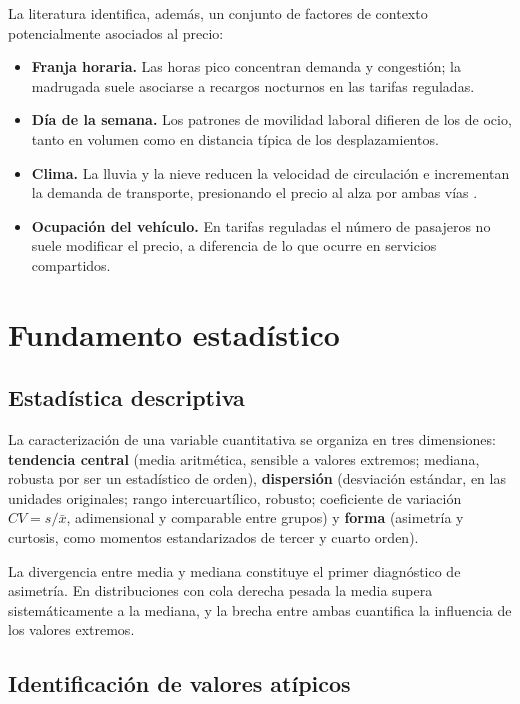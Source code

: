 \documentclass[
]{book}
\providecommand{\tightlist}{%
  \setlength{\itemsep}{0pt}\setlength{\parskip}{0pt}}
\begin{document}
La literatura identifica, además, un conjunto de factores de contexto potencialmente
asociados al precio:

\begin{itemize}
\tightlist
\item
  \textbf{Franja horaria.} Las horas pico concentran demanda y congestión; la madrugada suele
  asociarse a recargos nocturnos en las tarifas reguladas.
\item
  \textbf{Día de la semana.} Los patrones de movilidad laboral difieren de los de ocio, tanto en
  volumen como en distancia típica de los desplazamientos.
\item
  \textbf{Clima.} La lluvia y la nieve reducen la velocidad de circulación e incrementan la demanda
  de transporte, presionando el precio al alza por ambas vías \citep{brodeur2018}.
\item
  \textbf{Ocupación del vehículo.} En tarifas reguladas el número de pasajeros no suele modificar
  el precio, a diferencia de lo que ocurre en servicios compartidos.
\end{itemize}

\section{Fundamento estadístico}\label{fundamento-estaduxedstico}

\subsection{Estadística descriptiva}\label{estaduxedstica-descriptiva}

La caracterización de una variable cuantitativa se organiza en tres dimensiones:
\textbf{tendencia central} (media aritmética, sensible a valores extremos; mediana, robusta por ser
un estadístico de orden), \textbf{dispersión} (desviación estándar, en las unidades originales;
rango intercuartílico, robusto; coeficiente de variación \(CV = s/\bar{x}\), adimensional y
comparable entre grupos) y \textbf{forma} (asimetría y curtosis, como momentos estandarizados de
tercer y cuarto orden).

La divergencia entre media y mediana constituye el primer diagnóstico de asimetría. En
distribuciones con cola derecha pesada la media supera sistemáticamente a la mediana, y la
brecha entre ambas cuantifica la influencia de los valores extremos.

\subsection{Identificación de valores atípicos}\label{identificaciuxf3n-de-valores-atuxedpicos}
\end{document}
